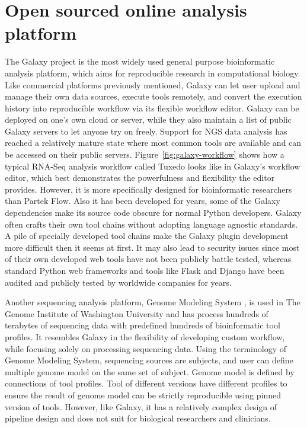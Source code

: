 


\section{Open sourced online analysis platform}

The Galaxy project \cite{goecks2010:galaxy} is the most widely used general
purpose bioinformatic analysis platform, which aims for reproducible research
in computational biology. Like commercial platforms previously mentioned,
Galaxy can let user upload and manage their own data sources, execute tools
remotely, and convert the execution history into reproducible workflow via its
flexible workflow editor. Galaxy can be deployed on one's own cloud or server,
while they also maintain a list of public Galaxy servers to let anyone try on
freely. Support for NGS data analysis has reached a relatively mature state
where most common tools are available and can be accessed on their public
servers. Figure~\ref{fig:galaxy-workflow} shows how a typical RNA-Seq analysis
workflow called Tuxedo looks like in Galaxy's workflow editor, which best
demonstrates the powerfulness and flexibility the editor provides. However, it
is more specifically designed for bioinformatic researchers than Partek Flow.
Also it has been developed for years, some of the Galaxy dependencies make its
source code obscure for normal Python developers. Galaxy often crafts their
own tool chains without adopting language agnostic standards. A pile of
specially developed tool chains make the Galaxy plugin development more
difficult then it seems at first. It may also lead to security issues since
most of their own developed web tools have not been publicly battle tested,
whereas standard Python web frameworks and tools like Flask and Django have
been audited and publicly tested by worldwide companies for years.



Another sequencing analysis platform, Genome Modeling System
\cite{griffith2015:genome}, is used in The Genome Institute of Washington
University and has process hundreds of terabytes of sequencing data with
predefined hundreds of bioinformatic tool profiles. It resembles Galaxy in the
flexibility of developing custom workflow, while focusing solely on processing
sequencing data. Using the terminology of Genome Modeling System, sequencing
sources are subjects, and user can define multiple genome model on the same set
of subject. Genome model is defined by connections of tool profiles. Tool of
different versions have different profiles to ensure the result of genome model
can be strictly reproducible using pinned version of tools. However, like
Galaxy, it has a relatively complex design of pipeline design and does not suit
for biological researchers and clinicians.



